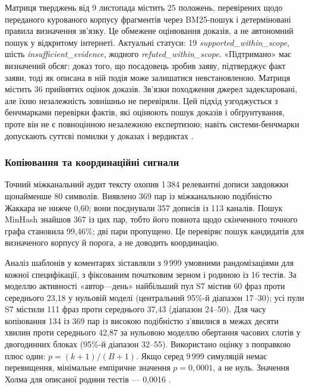 Матриця тверджень від 9 листопада містить 25 положень, перевірених щодо переданого курованого корпусу фрагментів через BM25-пошук і детерміновані правила визначення зв'язку. Це обмежене оцінювання доказів, а не автономний пошук у відкритому інтернеті. Актуальні статуси: 19 \emph{supported\_within\_scope}, шість \emph{insufficient\_evidence}, жодного \emph{refuted\_within\_scope}. «Підтримано» має визначений обсяг: доказ того, що посадовець зробив заяву, підтверджує факт заяви, тоді як описана в ній подія може залишатися невстановленою. Матриця містить 36 прийнятих оцінок доказів. Зв'язки походження джерел задекларовані, але їхню незалежність зовнішньо не перевіряли. Цей підхід узгоджується з бенчмарками перевірки фактів, які оцінюють пошук доказів і обґрунтування, проте він не є повноцінною незалежною експертизою; навіть системи-бенчмарки допускають суттєві помилки у доказах і вердиктах \citep{thorne2018fever,schlichtkrull2023averitec,schlichtkrull2024averitecshared,rothermel2024infact}.

\subsubsection{Копіювання та координаційні сигнали}

Точний міжканальний аудит тексту охопив 1\,384 релевантні дописи завдовжки щонайменше 80 символів. Виявлено 369 пар із міжканальною подібністю Жаккара не нижче 0,60; вони поєднували 357 дописів із 113 каналів. Пошук MinHash знайшов 367 із цих пар, тобто його повнота щодо скінченного точного графа становила 99,46\%; дві пари пропущено. Це перевіряє пошук кандидатів для визначеного корпусу й порога, а не доводить координацію.

Аналіз шаблонів у коментарях зіставляли з 9\,999 умовними рандомізаціями для кожної специфікації, з фіксованим початковим зерном і родиною із 16 тестів. За моделлю активності «автор—день» найбільший пул S7 містив 60 фраз проти середнього 23,18 у нульовій моделі (центральний 95\%-й діапазон 17–30); усі пули S7 містили 111 фраз проти середнього 37,43 (діапазон 24–50). Для часу копіювання 134 із 369 пар із високою подібністю з'явилися в межах десяти хвилин проти середнього 42,87 за нульовою моделлю обертання часових слотів у двогодинних блоках (95\%-й діапазон 32–55). Використано оцінку з поправкою плюс один: $p=(k+1)/(B+1)$. Якщо серед 9\,999 симуляцій немає перевищення, мінімальне емпіричне значення $p=0{,}0001$, а не нуль. Значення Холма для описаної родини тестів — 0,0016 \citep{phipson2010permutation,holm1979simple}.


